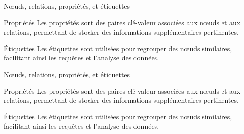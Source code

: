 \begin{frame}{Nœuds, relations, propriétés, et étiquettes}
  \begin{block}{Propriétés}
    Les propriétés sont des paires clé-valeur associées aux nœuds et aux relations, permettant de stocker des informations supplémentaires pertinentes.
  \end{block}
  \begin{block}{Étiquettes}
    Les étiquettes sont utilisées pour regrouper des nœuds similaires, facilitant ainsi les requêtes et l'analyse des données.
  \end{block}
\end{frame}

\begin{frame}{Nœuds, relations, propriétés, et étiquettes}
  
  \begin{block}{Propriétés}
    Les propriétés sont des paires clé-valeur associées aux nœuds et aux relations, permettant de stocker des informations supplémentaires pertinentes.
  \end{block}
  \begin{block}{Étiquettes}
    Les étiquettes sont utilisées pour regrouper des nœuds similaires, facilitant ainsi les requêtes et l'analyse des données.
  \end{block}
\end{frame}